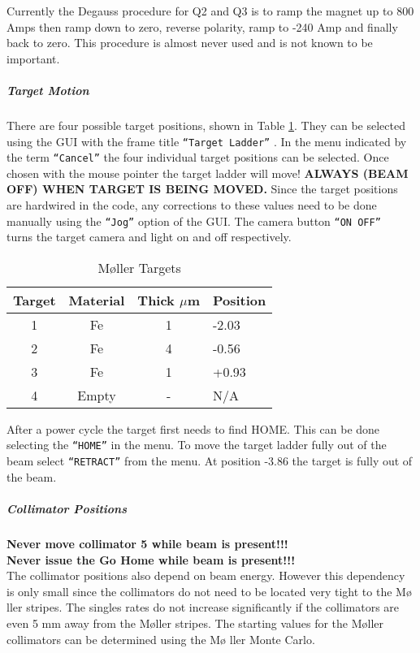 {Currently the Degauss procedure for Q2 and Q3 is to ramp the magnet up
to 800 Amps then ramp down to zero, reverse polarity, ramp to -240 Amp
and finally back to zero. This procedure is almost never used and is
not known to be important.

%
\subparagraph{Target Motion}
There are four possible target positions, shown in
Table \ref{tab_moltar}. They can be selected using the GUI with the
frame title {\tt ``Target Ladder''} . In the menu indicated by the
term {\tt ``Cancel''} the four individual target positions can be
selected. Once chosen with the mouse pointer the target ladder will
move! {\bf ALWAYS (BEAM OFF) WHEN TARGET IS BEING MOVED.}  Since the
target positions are hardwired in the code, any corrections to these
values need to be done manually using the {\tt ``Jog''} option of the
GUI. The camera button {\tt ``ON OFF'' } turns the target camera and
light on and off respectively.

\begin{table}
\begin{center}
\begin{tabular}{|c|c|c|l|} \hline
Target & Material & Thick $\mu$m & Position \\
\hline
1 & Fe & 1 & -2.03   \\
2 & Fe & 4 & -0.56  \\
3 & Fe & 1 & +0.93  \\
4 & Empty & - & N/A    \\
\hline 
\end{tabular}
\parbox{10cm}{
\caption{M\o ller Targets\label{tab_moltar}}}
\end{center}
\end{table}
%
After a power cycle the target first needs to find HOME. This can be
done selecting the {\tt ``HOME''} in the menu. To move the target
ladder fully out of the beam select {\tt ``RETRACT''} from the menu.
At position -3.86 the target is fully out of the beam.
%
\subparagraph{Collimator Positions}
{\bf Never move collimator 5 while beam is present!!!}\\ {\bf Never
issue the Go Home while beam is present!!!}\\ The collimator positions
also depend on beam energy. However this dependency is only small
since the collimators do not need to be located very tight to the M\o
ller stripes. The singles rates do not increase significantly if the
collimators are even 5 mm away from the M\o ller stripes. The starting
values for the M\o ller collimators can be determined using the M\o
ller Monte Carlo.

}
